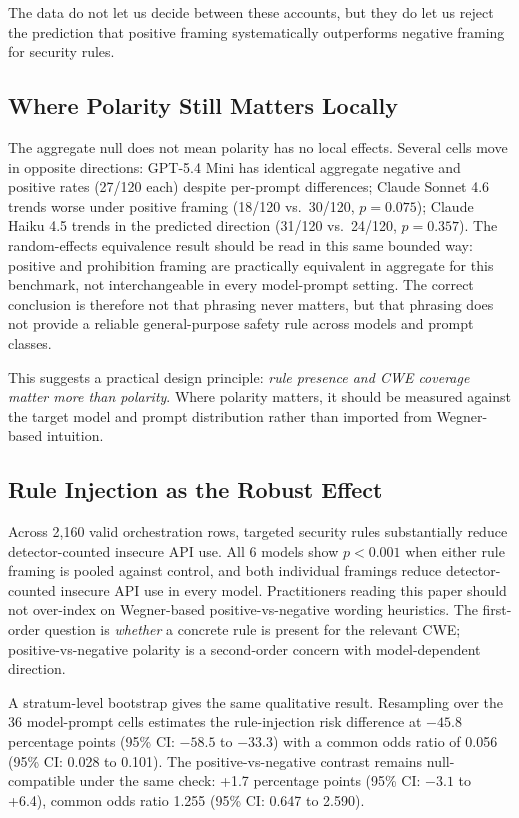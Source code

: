 \documentclass[11pt,a4paper]{article}
\begin{document}
The data do not let us decide between these accounts, but they do let us reject the prediction that positive framing systematically outperforms negative framing for security rules.

\subsection{Where Polarity Still Matters Locally}

The aggregate null does not mean polarity has no local effects. Several cells move in opposite directions: GPT-5.4 Mini has identical aggregate negative and positive rates (27/120 each) despite per-prompt differences; Claude Sonnet 4.6 trends worse under positive framing (18/120 vs.\ 30/120, $p=0.075$); Claude Haiku 4.5 trends in the predicted direction (31/120 vs.\ 24/120, $p=0.357$). The random-effects equivalence result should be read in this same bounded way: positive and prohibition framing are practically equivalent in aggregate for this benchmark, not interchangeable in every model-prompt setting. The correct conclusion is therefore not that phrasing never matters, but that phrasing does not provide a reliable general-purpose safety rule across models and prompt classes.

This suggests a practical design principle: \emph{rule presence and CWE coverage matter more than polarity}. Where polarity matters, it should be measured against the target model and prompt distribution rather than imported from Wegner-based intuition.

\subsection{Rule Injection as the Robust Effect}

Across 2{,}160 valid orchestration rows, targeted security rules substantially reduce detector-counted insecure API use. All 6 models show $p < 0.001$ when either rule framing is pooled against control, and both individual framings reduce detector-counted insecure API use in every model. Practitioners reading this paper should not over-index on Wegner-based positive-vs-negative wording heuristics. The first-order question is \emph{whether} a concrete rule is present for the relevant CWE; positive-vs-negative polarity is a second-order concern with model-dependent direction.

A stratum-level bootstrap gives the same qualitative result. Resampling over the 36 model-prompt cells estimates the rule-injection risk difference at $-45.8$ percentage points (95\% CI: $-58.5$ to $-33.3$) with a common odds ratio of 0.056 (95\% CI: 0.028 to 0.101). The positive-vs-negative contrast remains null-compatible under the same check: +1.7 percentage points (95\% CI: $-3.1$ to +6.4), common odds ratio 1.255 (95\% CI: 0.647 to 2.590).
\end{document}
